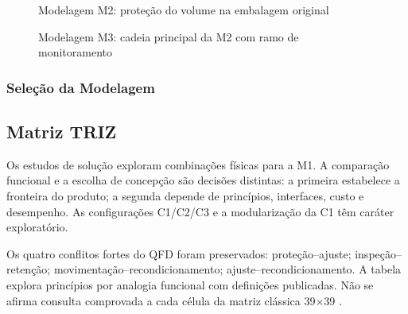 \begin{landscape}
\begin{figure}[H]
\centering
\caption{Modelagem M2: proteção do volume na embalagem original}
\label{fig:modelagem-m2}
\end{figure}
\end{landscape}

\begin{landscape}
\begin{figure}[H]
\centering
\caption{Modelagem M3: cadeia principal da M2 com ramo de monitoramento}
\label{fig:modelagem-m3}
\end{figure}
\end{landscape}



\subsubsection{Seleção da Modelagem}



\subsection{Matriz TRIZ}

Os estudos de solução exploram combinações físicas para a M1. A comparação funcional e a escolha de concepção são decisões distintas: a primeira estabelece a fronteira do produto; a segunda depende de princípios, interfaces, custo e desempenho. As configurações C1/C2/C3 e a modularização da C1 têm caráter exploratório.

Os quatro conflitos fortes do QFD foram preservados: proteção--ajuste; inspeção--retenção; movimentação--recondicionamento; ajuste--recondicionamento. A tabela explora princípios por analogia funcional com definições publicadas. Não se afirma consulta comprovada a cada célula da matriz clássica 39$\times$39 \citep{dtoceantriz,childstriz}.

